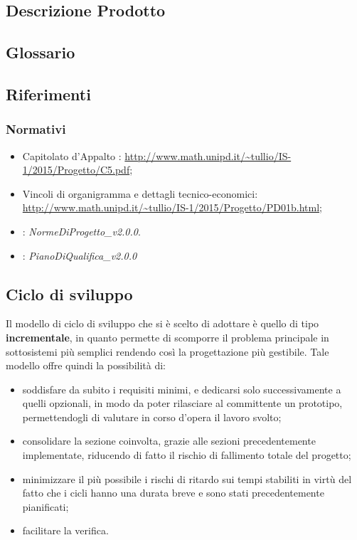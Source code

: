\documentclass[12pt,a4paper]{article}
\begin{document}
\subsection{Descrizione Prodotto}
\descrizioneProdotto

\subsection{Glossario}\label{glossario}
\glossarioPrint

\subsection{Riferimenti}\label{riferimenti}

\subsubsection{Normativi}
\begin{itemize}
	\item Capitolato d’Appalto \prjL: \url{http://www.math.unipd.it/~tullio/IS-1/2015/Progetto/C5.pdf};
	\item Vincoli di organigramma e dettagli tecnico-economici: \url{http://www.math.unipd.it/~tullio/IS-1/2015/Progetto/PD01b.html};
	\item \NdP: \textit{NormeDiProgetto\_v2.0.0}. 
	\item \PdQ: \textit{PianoDiQualifica\_v2.0.0}
\end{itemize}

\subsection{Ciclo di sviluppo}
Il modello di ciclo di sviluppo che si è scelto di adottare è quello di tipo \textbf{incrementale}, in quanto permette di scomporre il problema principale in sottosistemi più semplici rendendo così la progettazione più gestibile. Tale modello offre quindi la possibilità di:
\begin{itemize}
	\item soddisfare da subito i requisiti minimi, e dedicarsi solo successivamente a quelli opzionali, in modo da poter rilasciare al committente un prototipo, permettendogli di valutare in corso d'opera il lavoro svolto;
	\item consolidare la sezione coinvolta, grazie alle sezioni precedentemente implementate, riducendo di fatto il rischio di fallimento totale del progetto;
	\item minimizzare il più possibile i rischi di ritardo sui tempi stabiliti in virtù del fatto che i cicli hanno una durata breve e sono stati precedentemente pianificati;
	\item facilitare la verifica.
\end{itemize}
\end{document}
